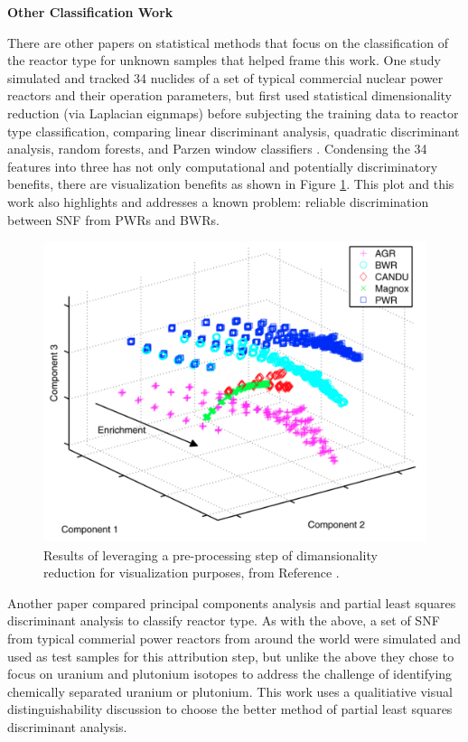 \noindent \textbf{Other Classification Work}

There are other papers on statistical methods that focus on the classification
of the reactor type for unknown samples that helped frame this work.  One study
simulated and tracked 34 nuclides of a set of typical commercial nuclear power
reactors and their operation parameters, but first used statistical
dimensionality reduction (via Laplacian eignmaps) before subjecting the
training data to reactor type classification, comparing linear discriminant
analysis, quadratic discriminant analysis, random forests, and Parzen window
classifiers \cite{jones_snf_2014}.  Condensing the 34 features into three has
not only computational and potentially discriminatory benefits, there are
visualization benefits as shown in Figure \ref{fig:jones}.  This plot and this
work also highlights and addresses a known problem: reliable discrimination
between \gls{SNF} from \glspl{PWR} and \glspl{BWR}. 

\begin{figure}[!htb]
  \centering
  \includegraphics[width=0.7\linewidth]{./chapters/litrev/jones.png}
  \caption{Results of leveraging a pre-processing step of dimansionality 
           reduction for visualization purposes, from Reference 
           \cite{jones_snf_2014}.}
  \label{fig:jones}
\end{figure}

Another paper compared principal components analysis and partial least squares
discriminant analysis to classify reactor type. As with the above, a set of
\gls{SNF} from typical commerial power reactors from around the world were
simulated and used as test samples for this attribution step, but unlike the
above they chose to focus on uranium and plutonium isotopes to address the
challenge of identifying chemically separated uranium or plutonium. This work
uses a qualitiative visual distinguishability discussion to choose the better
method of partial least squares discriminant analysis.

